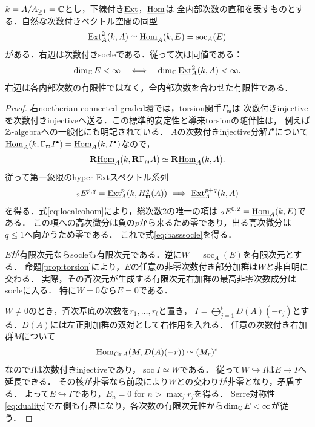 \documentclass[11pt,a4paper]{ltjsarticle}
\begin{document}
\begin{proposition}[一つの次数付きBass空間による有限性判定]\label{prop:basscriterion}
$k=A/A_{\geq1}=\mathbb C$とし，下線付き$\underline{\operatorname{Ext}}$，$\underline{\operatorname{Hom}}$は
全内部次数の直和を表すものとする．自然な次数付きベクトル空間の同型
\begin{equation}\label{eq:basssocle}
 \underline{\operatorname{Ext}}^{2}_A(k,A)
 \simeq\underline{\operatorname{Hom}}_A(k,E)=\operatorname{soc}_A(E)
\end{equation}
がある．右辺は次数付きsocleである．従って次は同値である：
\[
 \dim_\mathbb C E<\infty
 \quad\Longleftrightarrow\quad
 \dim_\mathbb C\underline{\operatorname{Ext}}^{2}_A(k,A)<\infty.
\]
右辺は各内部次数の有限性ではなく，全内部次数を合わせた有限性である．
\end{proposition}
\begin{proof}
右noetherian connected graded環では，torsion関手$\Gamma_{\mathfrak m}$は
次数付きinjectiveを次数付きinjectiveへ送る．この標準的安定性と導来torsionの随伴性は，
例えば$\mathbb Z$-algebraへの一般化\cite[Corollary 3.16, Proposition 3.17]{Mizuno}にも明記されている．
$A$の次数付きinjective分解$I^\bullet$について
$\underline{\operatorname{Hom}}_A(k,\Gamma_{\mathfrak m}I^\bullet)
 =\underline{\operatorname{Hom}}_A(k,I^\bullet)$なので，
\[
 \mathbf R\underline{\operatorname{Hom}}_A(k,\mathbf R\Gamma_{\mathfrak m}A)
 \simeq\mathbf R\underline{\operatorname{Hom}}_A(k,A).
\]
従って第一象限のhyper-Extスペクトル系列
\[
 {}_2E^{p,q}=\underline{\operatorname{Ext}}^{p}_A(k,H^q_{\mathfrak m}(A))
 \ \Longrightarrow\ \underline{\operatorname{Ext}}^{p+q}_A(k,A)
\]
を得る．式\eqref{eq:localcohom}により，総次数2の唯一の項は
${}_2E^{0,2}=\underline{\operatorname{Hom}}_A(k,E)$である．
この項への高次微分は負の$p$から来るため零であり，出る高次微分は$q\leq1$へ向かうため零である．
これで式\eqref{eq:basssocle}を得る．

$E$が有限次元ならsocleも有限次元である．逆に$W=\operatorname{soc}_A(E)$を有限次元とする．
命題\ref{prop:torsion}により，$E$の任意の非零次数付き部分加群は$W$と非自明に交わる．
実際，その斉次元が生成する有限次元右加群の最高非零次数成分はsocleに入る．
特に$W=0$なら$E=0$である．

$W\ne0$のとき，斉次基底の次数を$r_1,\ldots,r_t$と置き，
$I=\bigoplus_{j=1}^tD(A)(-r_j)$とする．$D(A)$には左正則加群の双対として右作用を入れる．
任意の次数付き右加群$M$について
\[
 \operatorname{Hom}_{\operatorname{Gr}A}(M,D(A)(-r))\simeq (M_r)^*
\]
なので$I$は次数付きinjectiveであり，$\operatorname{soc}I\simeq W$である．
従って$W\hookrightarrow I$は$E\to I$へ延長できる．
その核が非零なら前段により$W$との交わりが非零となり，矛盾する．
よって$E\hookrightarrow I$であり，$E_n=0$ for $n>\max_jr_j$を得る．
Serre対称性\eqref{eq:duality}で左側も有界になり，各次数の有限次元性から$\dim_\mathbb C E<\infty$が従う．
\end{proof}
\end{document}

